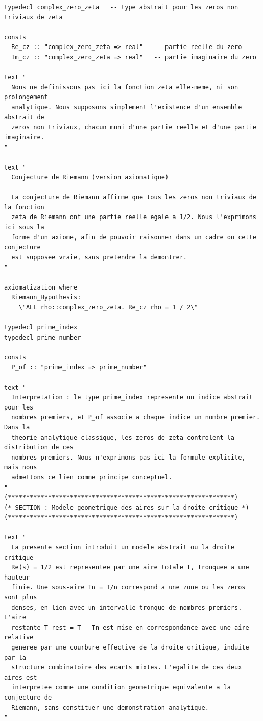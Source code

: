 \documentclass[a4paper,11pt]{article}
\begin{document}
\begin{holcode}[title={\textcolor{white}{Fichier : methode\_spectral.thy -- Partie 6/6 (FIN)}}]
\begin{lstlisting}
typedecl complex_zero_zeta   -- type abstrait pour les zeros non triviaux de zeta

consts
  Re_cz :: "complex_zero_zeta => real"   -- partie reelle du zero
  Im_cz :: "complex_zero_zeta => real"   -- partie imaginaire du zero

text "
  Nous ne definissons pas ici la fonction zeta elle-meme, ni son prolongement
  analytique. Nous supposons simplement l'existence d'un ensemble abstrait de
  zeros non triviaux, chacun muni d'une partie reelle et d'une partie imaginaire.
"

text "
  Conjecture de Riemann (version axiomatique)

  La conjecture de Riemann affirme que tous les zeros non triviaux de la fonction
  zeta de Riemann ont une partie reelle egale a 1/2. Nous l'exprimons ici sous la
  forme d'un axiome, afin de pouvoir raisonner dans un cadre ou cette conjecture
  est supposee vraie, sans pretendre la demontrer.
"

axiomatization where
  Riemann_Hypothesis:
    \"ALL rho::complex_zero_zeta. Re_cz rho = 1 / 2\"

typedecl prime_index
typedecl prime_number

consts
  P_of :: "prime_index => prime_number"

text "
  Interpretation : le type prime_index represente un indice abstrait pour les
  nombres premiers, et P_of associe a chaque indice un nombre premier. Dans la
  theorie analytique classique, les zeros de zeta controlent la distribution de ces
  nombres premiers. Nous n'exprimons pas ici la formule explicite, mais nous
  admettons ce lien comme principe conceptuel.
"
(**************************************************************)
(* SECTION : Modele geometrique des aires sur la droite critique *)
(**************************************************************)

text "
  La presente section introduit un modele abstrait ou la droite critique
  Re(s) = 1/2 est representee par une aire totale T, tronquee a une hauteur
  finie. Une sous-aire Tn = T/n correspond a une zone ou les zeros sont plus
  denses, en lien avec un intervalle tronque de nombres premiers. L'aire
  restante T_rest = T - Tn est mise en correspondance avec une aire relative
  generee par une courbure effective de la droite critique, induite par la
  structure combinatoire des ecarts mixtes. L'egalite de ces deux aires est
  interpretee comme une condition geometrique equivalente a la conjecture de
  Riemann, sans constituer une demonstration analytique.
"


\end{lstlisting}
\end{holcode}
\end{document}
